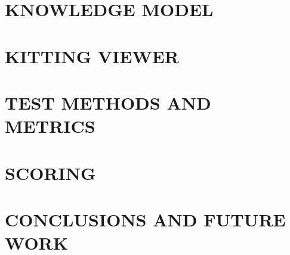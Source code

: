 \section{KNOWLEDGE MODEL}

\section{KITTING VIEWER}
\label{sect:KittingViewer}


\section{TEST METHODS AND METRICS}
\label{sect:Metrics}


\section{SCORING} 
\label{sect:Results}



\addtolength{\textheight}{-4cm}


\section{CONCLUSIONS AND FUTURE WORK}
\label{sect:Conclusions}





